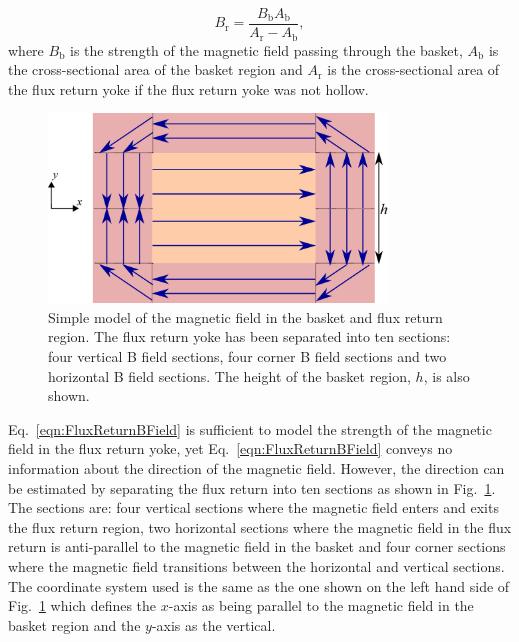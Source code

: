 \begin{equation}
  B_{\textrm{r}} = \frac{B_{\textrm{b}}A_{\textrm{b}}}{A_{\textrm{r}} - A_{\textrm{b}}},
  \label{eqn:FluxReturnBField}
\end{equation}
where $B_{\textrm{b}}$ is the strength of the magnetic field passing through the basket, $A_{\textrm{b}}$ is the cross-sectional area of the basket region and $A_{\textrm{r}}$ is the cross-sectional area of the flux return yoke if the flux return yoke was not hollow.
\newline
\newline
\begin{figure}
  \centering
  \includegraphics[width=9cm]{images/magnetic_field/BFieldDiagram}
  \caption{Simple model of the magnetic field in the basket and flux return region.  The flux return yoke has been separated into ten sections: four vertical B field sections, four corner B field sections and two horizontal B field sections.  The height of the basket region, $h$, is also shown.}
  \label{fig:BFieldDiagram}
\end{figure}
Eq.~\ref{eqn:FluxReturnBField} is sufficient to model the strength of the magnetic field in the flux return yoke, yet Eq.~\ref{eqn:FluxReturnBField} conveys no information about the direction of the magnetic field.  However, the direction can be estimated by separating the flux return into ten sections as shown in Fig.~\ref{fig:BFieldDiagram}.  The sections are: four vertical sections where the magnetic field enters and exits the flux return region, two horizontal sections where the magnetic field in the flux return is anti-parallel to the magnetic field in the basket and four corner sections where the magnetic field transitions between the horizontal and vertical sections.  The coordinate system used is the same as the one shown on the left hand side of Fig.~\ref{fig:BFieldDiagram} which defines the $x$-axis as being parallel to the magnetic field in the basket region and the $y$-axis as the vertical.  
